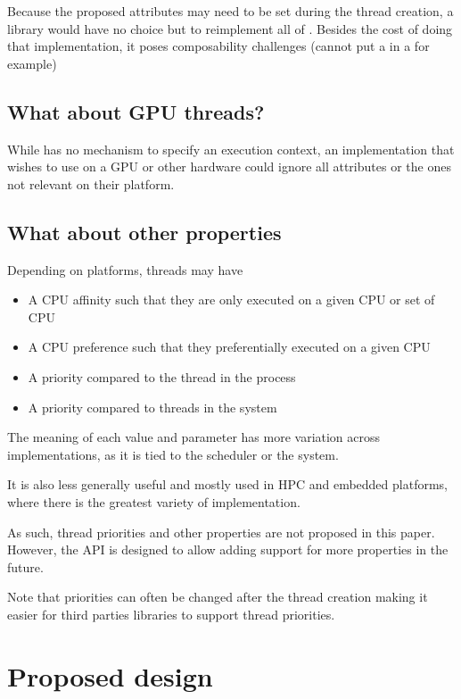 \documentclass{wg21}
\begin{document}
Because the proposed attributes may need to be set during the thread creation, a library would have no choice but
to reimplement all of .
Besides the cost of doing that implementation, it poses composability challenges (cannot put a  in a  for example)

\subsection{What about GPU threads?}

While  has no mechanism to specify an execution context, an implementation that wishes
to use  on a GPU or other hardware could ignore all attributes or the ones not relevant on their platform.

\subsection{What about other properties}

Depending on platforms, threads may have

\begin{itemize}
\item A CPU affinity such that they are only executed on a given CPU or set of CPU
\item A CPU preference such that they preferentially executed on a given CPU
\item A priority compared to the thread in the process
\item A priority compared to threads in the system
\end{itemize}

The meaning of each value and parameter has more variation across implementations,
as it is tied to the scheduler or the system.

It is also less generally useful and mostly used in HPC and embedded platforms, where there is the greatest variety of implementation.

As such, thread priorities and other properties are not proposed in this paper.
However, the API is designed to allow adding support for more properties in the future.

Note that priorities can often be changed after the thread creation making it easier for third
parties libraries to support thread priorities.


\section{Proposed design}
\end{document}
